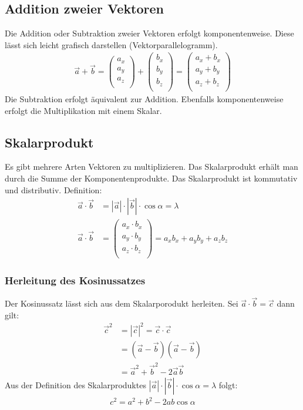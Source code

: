 \subsection{Addition zweier Vektoren}
Die Addition oder Subtraktion zweier Vektoren erfolgt komponentenweise. Diese lässt sich leicht grafisch darstellen (Vektorparallelogramm).
\begin{align*}
\vec{a}+\vec{b}=
	\left(\begin{array}{c}
	a_x \\ a_y \\ a_z \\
	\end{array}\right)+
	\left(\begin{array}{c}
	b_x \\ b_y \\ b_z \\
	\end{array}\right)=
	\left(\begin{array}{c}
	a_x+b_x \\ a_y+b_y \\ a_z+b_z \\
	\end{array}\right)
\end{align*}
Die Subtraktion erfolgt äquivalent zur Addition. Ebenfalls komponentenweise erfolgt die Multiplikation mit einem Skalar.
\subsection{Skalarprodukt}
Es gibt mehrere Arten Vektoren zu multiplizieren. Das Skalarprodukt erhält man durch die Summe der Komponentenprodukte. Das Skalarprodukt ist kommutativ und distributiv. Definition:
\begin{align*}
		\vec{a} \cdot \vec{b} &= \left| \vec{a}					\right| \cdot \left| \vec{b} \right|				\cdot \cos \alpha = \lambda \\
\vec{a}\cdot\vec{b}&=
	\left(\begin{array}{c}
	a_x \cdot b_x \\ a_y \cdot b_y \\ a_z \cdot 		b_z \\  
	\end{array}\right)
	= a_x b_x + a_y b_y + a_z b_z
\end{align*}
\subsubsection{Herleitung des Kosinussatzes}
Der Kosinussatz lässt sich aus dem Skalarporodukt herleiten. Sei $\vec{a} \cdot \vec{b} = \vec{c}$ dann gilt:
\begin{align*}
\vec{c}^{2}&=\left|\vec{c}\right|^{2}=\vec{c}\cdot \vec{c}\\
&=\left(\vec{a}-\vec{b}\right)\left(\vec{a}-\vec{b}\right)\\
&=\vec{a}^{2}+\vec{b}^{2}-2\vec{a}\vec{b}
\end{align*}
Aus der Definition des Skalarproduktes $\left| \vec{a} \right| \cdot \left| \vec{b} \right| \cdot \cos \alpha = \lambda $ folgt:
\begin{align*}
c^{2}=a^{2}+b^{2}-2ab\cos \alpha
\end{align*}
